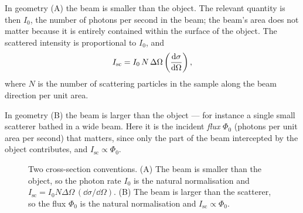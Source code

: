 In geometry (A) the beam is smaller than the object. The relevant quantity is then $I_0$, the number of photons per second in the beam; the beam's area does not matter because it is entirely contained within the surface of the object. The scattered intensity is proportional to $I_0$, and
\begin{equation}
    I_{\text{sc}} = I_0\,N\,\Delta\Omega\left(\dv{\sigma}{\Omega}\right),
\end{equation}
where $N$ is the number of scattering particles in the sample along the beam direction per unit area.

In geometry (B) the beam is larger than the object --- for instance a single small scatterer bathed in a wide beam. Here it is the incident \emph{flux} $\Phi_0$ (photons per unit area per second) that matters, since only the part of the beam intercepted by the object contributes, and $I_{\text{sc}} \propto \Phi_0$.

\begin{figure}[ht]
\centering
{}
\caption{Two cross-section conventions. (A) The beam is smaller than the object, so the photon rate $I_0$ is the natural normalisation and $I_{\text{sc}} = I_0 N \Delta\Omega\,(\dd\sigma/\dd\Omega)$. (B) The beam is larger than the scatterer, so the flux $\Phi_0$ is the natural normalisation and $I_{\text{sc}} \propto \Phi_0$.}
\label{fig:xrd-crosssection}
\end{figure}

